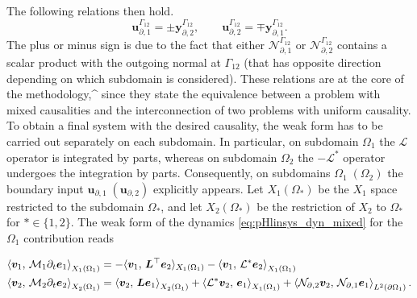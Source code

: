 The following relations then hold.
\begin{equation}\label{eq:int_var}
\bm{u}_{\partial, 1}^{\Gamma_{12}} =\pm \bm{y}_{\partial, 2}^{\Gamma_{12}}, \qquad \bm{u}_{\partial, 2}^{\Gamma_{12}} = \mp \bm{y}_{\partial, 1}^{\Gamma_{12}}.
\end{equation}
The plus or minus sign is due to the fact that either $\mathcal{N}_{\partial, 1}^{\Gamma_{12}}$ or $\mathcal{N}_{\partial, 2}^{\Gamma_{12}}$ contains a scalar product with the outgoing normal at ${\Gamma_{12}}$ (that has opposite direction depending on which subdomain is considered). These relations are at the core of the methodology,^ since they state the equivalence between a problem with mixed causalities and the interconnection of two problems with uniform causality.   \\

To obtain a final system with the desired causality, the weak form has to be carried out separately on each subdomain. In particular, on subdomain $\Omega_1$ the $\mathcal{L}$ operator is integrated by parts, whereas on subdomain $\Omega_2$ the $-\mathcal{L}^*$ operator undergoes the integration by parts. Consequently, on subdomains $\Omega_1 \; (\Omega_2)$ the boundary input $\bm{u}_{\partial, 1} \; (\bm{u}_{\partial, 2})$ explicitly appears. Let $X_1({\Omega_*})$ be the $X_1$ space restricted to the subdomain $\Omega_*$, and let $X_2({\Omega_*})$ be the restriction of $X_2$ to $\Omega_*$ for $* \in \{1,2\}$. The weak form of the dynamics \eqref{eq:pHlinsys_dyn_mixed} for the $\Omega_1$ contribution reads

\begin{equation}\label{eq:pHlinsys_weak_Om1}
\begin{aligned}
\inner[X_1({\Omega_1})]{\bm{v}_1}{\mathcal{M}_1 \partial_t \bm{e}_1} &=   -  \langle{\bm{v}_1}, \,{\bm{L}^\top \bm{e}_2}\rangle_{X_1({\Omega_1})}  -\inner[X_1({\Omega_1})]{\bm{v}_1}{\mathcal{L}^*\bm{e}_2}  \\
\inner[X_2({\Omega_1})]{\bm{v}_2}{\mathcal{M}_2 \partial_t \bm{e}_2} &=   \inner[X_2({\Omega_1})]{\bm{v}_2}{\bm{L}\bm{e}_1} + \inner[X_1({\Omega_1})]{\mathcal{L}^*\bm{v}_2}{\bm{e}_1} + \inner[L^2(\partial\Omega_1)]{\mathcal{N}_{\partial, 2} \bm{v}_2}{\mathcal{N}_{\partial, 1}\bm{e}_1}. \\
\end{aligned}
\end{equation}

